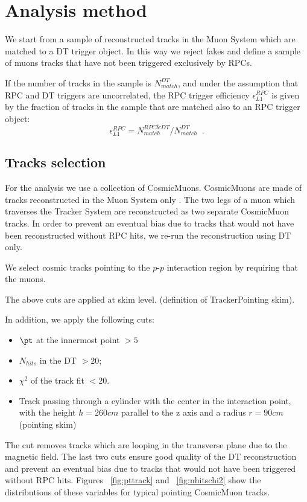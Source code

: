 \section{Analysis method}
We start from a sample of reconstructed tracks 
in the Muon System which are matched to a DT 
trigger object. In this way we reject fakes 
and define a sample of muons tracks that have not been 
triggered exclusively by RPCs.

If the number of tracks in the sample is 
$N_{match}^{DT}$, and under the assumption
that RPC and DT triggers are uncorrelated,
the RPC trigger efficiency 
$\epsilon_{L1}^{RPC}$ is given by the fraction 
of tracks in the sample that are matched also 
to an RPC trigger object:
\begin{equation}
\epsilon_{L1}^{RPC} = N_{match}^{RPC\&DT}/N_{match}^{DT} \,\,\,.
\end{equation}

\subsection{Tracks selection}
For the analysis we use a collection of CosmicMuons.
CosmicMuons are made of tracks reconstructed in the
Muon System only .
The two legs of a muon which traverses
the Tracker System are reconstructed as two separate 
CosmicMuon tracks.
In order to prevent an eventual bias due to tracks 
that would not have been reconstructed without
RPC hits, we re-run the reconstruction using DT only.

We select cosmic tracks pointing to the $p$-$p$ interaction
region by requiring that the muons.
 
The above cuts are applied at skim level.
(definition of TrackerPointing skim).

In addition, we apply the following 
cuts:
\begin{itemize}
\item
$\pt$ at the innermost point $ > 5$\GeVc 
\item
$N_{hits}$ in the DT $ > 20 $;
\item
$\chi^2$ of the track fit $ < 20 $.
\item
Track passing through a cylinder with the center
in the interaction point, with the height $h = 260 cm$ parallel to 
the z axis and a radius $r = 90 cm$ (pointing skim)
\end{itemize}
The \pt cut removes tracks which are
looping in the transverse plane due 
to the magnetic field. The last two cuts 
ensure good quality of the DT reconstruction 
and prevent an eventual bias due to 
tracks that would not have been triggered 
without RPC hits.
Figures ~\ref{fig:pttrack} and ~\ref{fig:nhitschi2} show 
the distributions of these variables for typical pointing
CosmicMuon tracks.

